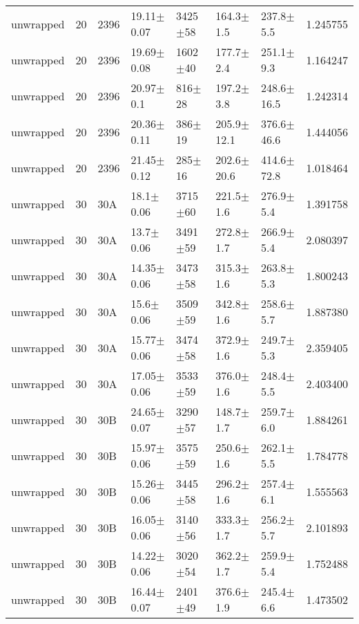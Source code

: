 \begin{tabular}{lrlllllr}
    unwrapped &      20 &    2396 &   19.11$\pm$0.07 &  3425$\pm$58 &   164.3$\pm$1.5 &   237.8$\pm$5.5 &    1.245755 \\
    unwrapped &      20 &    2396 &   19.69$\pm$0.08 &  1602$\pm$40 &   177.7$\pm$2.4 &   251.1$\pm$9.3 &    1.164247 \\
    unwrapped &      20 &    2396 &    20.97$\pm$0.1 &   816$\pm$28 &   197.2$\pm$3.8 &  248.6$\pm$16.5 &    1.242314 \\
    unwrapped &      20 &    2396 &   20.36$\pm$0.11 &   386$\pm$19 &  205.9$\pm$12.1 &  376.6$\pm$46.6 &    1.444056 \\
    unwrapped &      20 &    2396 &   21.45$\pm$0.12 &   285$\pm$16 &  202.6$\pm$20.6 &  414.6$\pm$72.8 &    1.018464 \\
    unwrapped &      30 &     30A &    18.1$\pm$0.06 &  3715$\pm$60 &   221.5$\pm$1.6 &   276.9$\pm$5.4 &    1.391758 \\
    unwrapped &      30 &     30A &    13.7$\pm$0.06 &  3491$\pm$59 &   272.8$\pm$1.7 &   266.9$\pm$5.4 &    2.080397 \\
    unwrapped &      30 &     30A &   14.35$\pm$0.06 &  3473$\pm$58 &   315.3$\pm$1.6 &   263.8$\pm$5.3 &    1.800243 \\
    unwrapped &      30 &     30A &    15.6$\pm$0.06 &  3509$\pm$59 &   342.8$\pm$1.6 &   258.6$\pm$5.7 &    1.887380 \\
    unwrapped &      30 &     30A &   15.77$\pm$0.06 &  3474$\pm$58 &   372.9$\pm$1.6 &   249.7$\pm$5.3 &    2.359405 \\
    unwrapped &      30 &     30A &   17.05$\pm$0.06 &  3533$\pm$59 &   376.0$\pm$1.6 &   248.4$\pm$5.5 &    2.403400 \\
    unwrapped &      30 &     30B &   24.65$\pm$0.07 &  3290$\pm$57 &   148.7$\pm$1.7 &   259.7$\pm$6.0 &    1.884261 \\
    unwrapped &      30 &     30B &   15.97$\pm$0.06 &  3575$\pm$59 &   250.6$\pm$1.6 &   262.1$\pm$5.5 &    1.784778 \\
    unwrapped &      30 &     30B &   15.26$\pm$0.06 &  3445$\pm$58 &   296.2$\pm$1.6 &   257.4$\pm$6.1 &    1.555563 \\
    unwrapped &      30 &     30B &   16.05$\pm$0.06 &  3140$\pm$56 &   333.3$\pm$1.7 &   256.2$\pm$5.7 &    2.101893 \\
    unwrapped &      30 &     30B &   14.22$\pm$0.06 &  3020$\pm$54 &   362.2$\pm$1.7 &   259.9$\pm$5.4 &    1.752488 \\
    unwrapped &      30 &     30B &   16.44$\pm$0.07 &  2401$\pm$49 &   376.6$\pm$1.9 &   245.4$\pm$6.6 &    1.473502 \\

\end{tabular}
